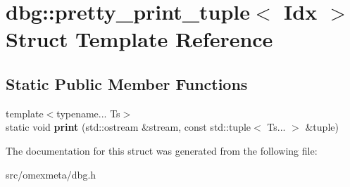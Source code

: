 \hypertarget{structdbg_1_1pretty__print__tuple}{}\section{dbg\+:\+:pretty\+\_\+print\+\_\+tuple$<$ Idx $>$ Struct Template Reference}
\label{structdbg_1_1pretty__print__tuple}
\subsection*{Static Public Member Functions}
\begin{DoxyCompactItemize}
\item 
\mbox{\label{structdbg_1_1pretty__print__tuple_a17c2bca6c330e88da2082efa4c3a9be5}} 
{\footnotesize template$<$typename... Ts$>$ }\\static void {\bfseries print} (std\+::ostream \&stream, const std\+::tuple$<$ Ts... $>$ \&tuple)
\end{DoxyCompactItemize}


The documentation for this struct was generated from the following file\+:\begin{DoxyCompactItemize}
\item 
src/omexmeta/dbg.\+h\end{DoxyCompactItemize}
